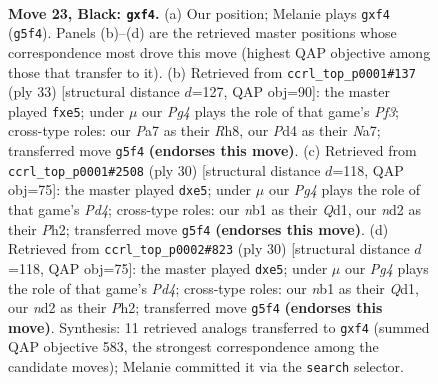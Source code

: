 \documentclass[11pt]{article}
\begin{document}
\clearpage

\begin{figure}[p]\centering
\begin{subfigure}{0.46\textwidth}\centering
\resizebox{\linewidth}{!}{%
\newchessgame
\chessboard[
  setfen={r1b1r1k1/p2nb2p/2p5/3q2p1/Pp1p1P2/1P1Q2P1/3NPK2/RNBR4 b - - 1 23},
  showmover=false,
  pgfstyle=straightmove, color=movearrow, markmove={g5-f4}
]}
\caption{}
\end{subfigure}\hfill
\begin{subfigure}{0.46\textwidth}\centering
\resizebox{\linewidth}{!}{%
\newchessgame
\chessboard[
  setfen={1r2kb1r/n1qb1p2/3ppp2/p3P2p/1p3P2/1P1BQ3/P1PNN1PP/1K1RR3 b k - 0 17},
  showmover=false,
  pgfstyle=straightmove, color=movearrow, markmove={f6-e5}
]}
\caption{}
\end{subfigure}
\\[4pt]
\begin{subfigure}{0.46\textwidth}\centering
\resizebox{\linewidth}{!}{%
\newchessgame
\chessboard[
  setfen={6k1/p2nbrpp/q2p1n2/4p3/Pp1PP3/5P2/1PP3PP/R1BQK2R w KQ - 0 16},
  showmover=false,
  pgfstyle=straightmove, color=movearrow, markmove={d4-e5}
]}
\caption{}
\end{subfigure}\hfill
\begin{subfigure}{0.46\textwidth}\centering
\resizebox{\linewidth}{!}{%
\newchessgame
\chessboard[
  setfen={6k1/p2nbrpp/q2p1n2/4p3/Pp1PP3/5P2/1PP3PP/R1BQK2R w KQ - 0 16},
  showmover=false,
  pgfstyle=straightmove, color=movearrow, markmove={d4-e5}
]}
\caption{}
\end{subfigure}
\caption{\textbf{Move 23, Black: \texttt{gxf4}.} (a) Our position; Melanie plays \texttt{gxf4} (\texttt{g5f4}). Panels (b)--(d) are the retrieved master positions whose correspondence most drove this move (highest QAP objective among those that transfer to it). (b) Retrieved from \texttt{ccrl\_top\_p0001\#137} (ply 33) [structural distance $d$=127, QAP obj=90]: the master played \texttt{fxe5}; under $\mu$ our \emph{Pg4} plays the role of that game's \emph{Pf3}; cross-type roles: our \emph{P}a7 as their \emph{R}h8, our \emph{P}d4 as their \emph{N}a7; transferred move \texttt{g5f4} \textbf{(endorses this move)}. (c) Retrieved from \texttt{ccrl\_top\_p0001\#2508} (ply 30) [structural distance $d$=118, QAP obj=75]: the master played \texttt{dxe5}; under $\mu$ our \emph{Pg4} plays the role of that game's \emph{Pd4}; cross-type roles: our \emph{n}b1 as their \emph{Q}d1, our \emph{n}d2 as their \emph{P}h2; transferred move \texttt{g5f4} \textbf{(endorses this move)}. (d) Retrieved from \texttt{ccrl\_top\_p0002\#823} (ply 30) [structural distance $d$=118, QAP obj=75]: the master played \texttt{dxe5}; under $\mu$ our \emph{Pg4} plays the role of that game's \emph{Pd4}; cross-type roles: our \emph{n}b1 as their \emph{Q}d1, our \emph{n}d2 as their \emph{P}h2; transferred move \texttt{g5f4} \textbf{(endorses this move)}. Synthesis: 11 retrieved analogs transferred to \texttt{gxf4} (summed QAP objective 583, the strongest correspondence among the candidate moves); Melanie committed it via the \texttt{search} selector.}
\label{fig:thought-m45}
\end{figure}
\end{document}
